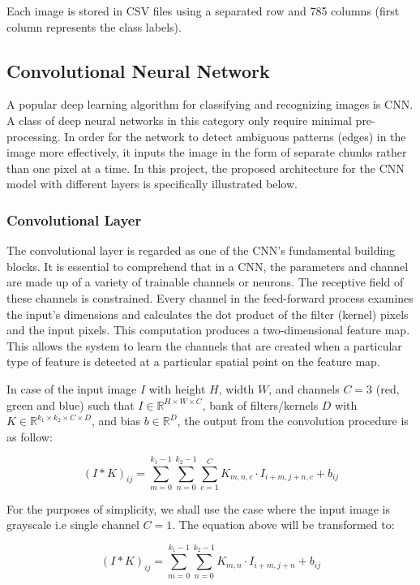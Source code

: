 \documentclass[conference]{IEEEtran}
\begin{document}
Each image is stored in CSV files using a separated row and 785 columns (first column represents the class labels).

\subsection{Convolutional Neural Network}

A popular deep learning algorithm for classifying and recognizing images is CNN. A class of deep neural networks in this category only require minimal pre-processing. In order for the network to detect ambiguous patterns (edges) in the image more effectively, it inputs the image in the form of separate chunks rather than one pixel at a time. In this project, the proposed architecture for the CNN model with different layers is specifically illustrated below.

\subsubsection{Convolutional Layer}

The convolutional layer is regarded as one of the CNN's fundamental building blocks. It is essential to comprehend that in a CNN, the parameters and channel are made up of a variety of trainable channels or neurons. The receptive field of these channels is constrained. Every channel in the feed-forward process examines the input's dimensions and calculates the dot product of the filter (kernel) pixels and the input pixels. This computation produces a two-dimensional feature map. This allows the system to learn the channels that are created when a particular type of feature is detected at a particular spatial point on the feature map.

In case of the input image \( I \) with height \( H \), width \( W \), and channels \( C = 3\) (red, green and blue) such that \( I \in \mathbb{R}^{H \times W \times C} \), bank of filters/kernels  \( D \) with \( K \in \mathbb{R}^{k_1 \times k_2 \times C \times D} \), and bias \( b \in \mathbb{R}^{D} \), the output from the convolution procedure is as follow: 

\[ (I \ast K)_{ij} = \sum_{m=0}^{k_1 -1}\sum_{n=0}^{k_2 -1}\sum_{c=1}^{C}K_{m,n,c} \cdot I_{i+m,j+n,c} +b_{ij}\]

For the purposes of simplicity, we shall use the case where the input image is grayscale i.e single channel \( C = 1\). The equation above will be transformed to:

\[ (I \ast K)_{ij} = \sum_{m=0}^{k_1 -1}\sum_{n=0}^{k_2 -1}K_{m,n} \cdot I_{i+m,j+n} +b_{ij}\]
\end{document}
